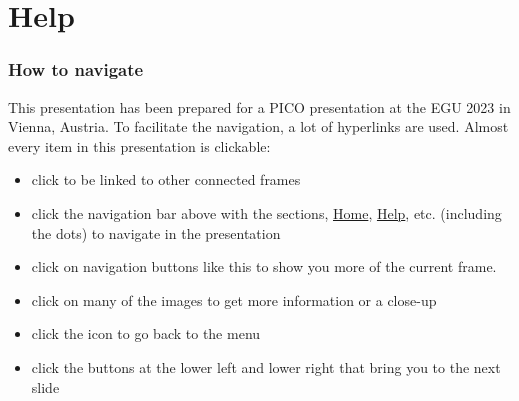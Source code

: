 \section{Help} \label{sec:help}

\begin{frame}
	\frametitle[Help]{How to navigate}
	This presentation has been prepared for a PICO presentation at the EGU 2023 in Vienna, Austria. To facilitate the navigation, a lot of hyperlinks are used. Almost every item in this presentation is clickable:
	\begin{itemize}
		\item click  to be linked to other connected frames
		\item click the navigation bar above with the sections, \hyperlink{sec:home}{Home}, \hyperlink{sec:help}{Help}, etc. (including the dots) to navigate in the presentation
		\item click on navigation buttons like this \slidebuttons to show you more of the current frame. \only<2>{\textcolor{red}{For example this text.}}
		\item click on many of the images to get more information or a close-up
		\item click the \hyperlink{sec:home}{} icon to go back to the menu
		\item click the buttons at the lower left and lower right that bring you to the next slide
	\end{itemize}
\end{frame}